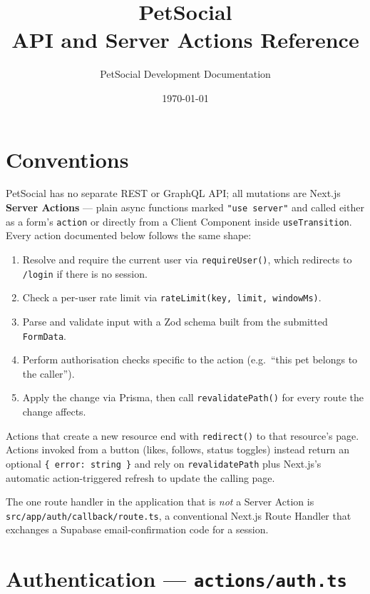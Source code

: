 \documentclass[11pt,a4paper]{article}
\title{PetSocial\\\large API and Server Actions Reference}
\author{PetSocial Development Documentation}
\date{\today}
\begin{document}
\maketitle
\thispagestyle{fancy}
\tableofcontents

\section{Conventions}
PetSocial has no separate REST or GraphQL API; all mutations are Next.js
\textbf{Server Actions} --- plain async functions marked \texttt{"use server"} and
called either as a form's \texttt{action} or directly from a Client Component inside
\texttt{useTransition}. Every action documented below follows the same shape:

\begin{enumerate}[leftmargin=*]
  \item Resolve and require the current user via \texttt{requireUser()}, which
        redirects to \texttt{/login} if there is no session.
  \item Check a per-user rate limit via \texttt{rateLimit(key, limit, windowMs)}.
  \item Parse and validate input with a Zod schema built from the submitted
        \texttt{FormData}.
  \item Perform authorisation checks specific to the action (e.g.\ ``this pet belongs
        to the caller'').
  \item Apply the change via Prisma, then call \texttt{revalidatePath()} for every
        route the change affects.
\end{enumerate}

Actions that create a new resource end with \texttt{redirect()} to that resource's
page. Actions invoked from a button (likes, follows, status toggles) instead return an
optional \texttt{\{ error: string \}} and rely on \texttt{revalidatePath} plus Next.js's
automatic action-triggered refresh to update the calling page.

The one route handler in the application that is \emph{not} a Server Action is
\texttt{src/app/auth/callback/route.ts}, a conventional Next.js Route Handler that
exchanges a Supabase email-confirmation code for a session.

\section{Authentication --- \texttt{actions/auth.ts}}
\end{document}
